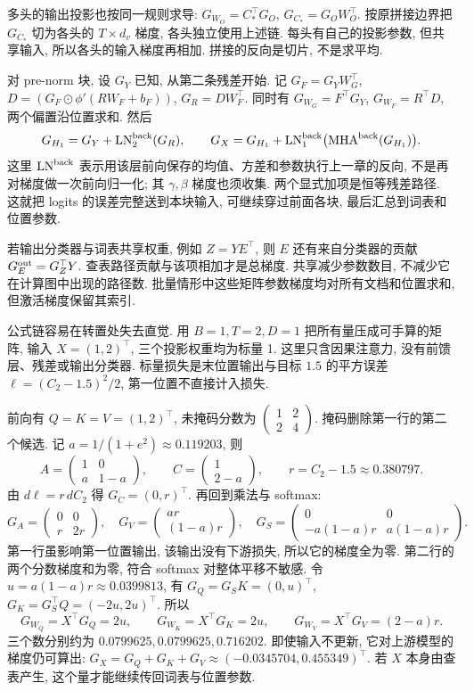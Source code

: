 多头的输出投影也按同一规则求导: $G_{W_O}=C_*^\top G_O$, $G_{C_*}=G_OW_O^\top$. 按原拼接边界把 $G_{C_*}$ 切为各头的 $T\times d_v$ 梯度, 各头独立使用上述链. 每头有自己的投影参数, 但共享输入, 所以各头的输入梯度再相加. 拼接的反向是切片, 不是求平均.

对 pre-norm 块, 设 $G_Y$ 已知, 从第二条残差开始. 记
$G_F=G_YW_G^\top$,
$D=(G_F\odot\phi'(RW_F+b_F))$,
$G_R=DW_F^\top$.
同时有 $G_{W_G}=F^\top G_Y$, $G_{W_F}=R^\top D$, 两个偏置沿位置求和. 然后
\[
G_{H_1}=G_Y+\operatorname{LN}_2^{\rm back}(G_R),\qquad
G_X=G_{H_1}+\operatorname{LN}_1^{\rm back}
\bigl(\operatorname{MHA}^{\rm back}(G_{H_1})\bigr).
\]
这里 $\operatorname{LN}^{\rm back}$ 表示用该层前向保存的均值、方差和参数执行上一章的反向, 不是再对梯度做一次前向归一化; 其 $\gamma,\beta$ 梯度也须收集. 两个显式加项是恒等残差路径. 这就把 logits 的误差完整送到本块输入, 可继续穿过前面各块, 最后汇总到词表和位置参数.

若输出分类器与词表共享权重, 例如 $Z=YE^\top$, 则 $E$ 还有来自分类器的贡献 $G_E^{\rm out}=G_Z^\top Y$. 查表路径贡献与该项相加才是总梯度. 共享减少参数数目, 不减少它在计算图中出现的路径数. 批量情形中这些矩阵参数梯度均对所有文档和位置求和, 但激活梯度保留其索引.

\label{sec:attention-numeric}
公式链容易在转置处失去直觉. 用 $B=1,T=2,D=1$ 把所有量压成可手算的矩阵, 输入 $X=(1,2)^\top$, 三个投影权重均为标量 1. 这里只含因果注意力, 没有前馈层、残差或输出分类器. 标量损失是末位置输出与目标 $1.5$ 的平方误差 $\ell=(C_2-1.5)^2/2$, 第一位置不直接计入损失.

前向有 $Q=K=V=(1,2)^\top$, 未掩码分数为 $\left(\begin{smallmatrix}1&2\\2&4\end{smallmatrix}\right)$. 掩码删除第一行的第二个候选. 记 $a=1/(1+e^2)\approx0.119203$, 则
\[
A=\begin{pmatrix}1&0\\a&1-a\end{pmatrix},\qquad
C=\begin{pmatrix}1\\2-a\end{pmatrix},\qquad
r=C_2-1.5\approx0.380797.
\]
由 $d\ell=r\,dC_2$ 得 $G_C=(0,r)^\top$. 再回到乘法与 softmax:
\[
G_A=\begin{pmatrix}0&0\\r&2r\end{pmatrix},\quad
G_V=\begin{pmatrix}ar\\(1-a)r\end{pmatrix},\quad
G_S=\begin{pmatrix}0&0\\-a(1-a)r&a(1-a)r\end{pmatrix}.
\]
第一行虽影响第一位置输出, 该输出没有下游损失, 所以它的梯度全为零. 第二行的两个分数梯度和为零, 符合 softmax 对整体平移不敏感. 令 $u=a(1-a)r\approx0.0399813$, 有 $G_Q=G_SK=(0,u)^\top$, $G_K=G_S^\top Q=(-2u,2u)^\top$. 所以
\[
G_{W_Q}=X^\top G_Q=2u,\qquad G_{W_K}=X^\top G_K=2u,
\qquad G_{W_V}=X^\top G_V=(2-a)r.
\]
三个数分别约为 $0.0799625,0.0799625,0.716202$. 即使输入不更新, 它对上游模型的梯度仍可算出: $G_X=G_Q+G_K+G_V\approx(-0.0345704,0.455349)^\top$. 若 $X$ 本身由查表产生, 这个量才能继续传回词表与位置参数.

